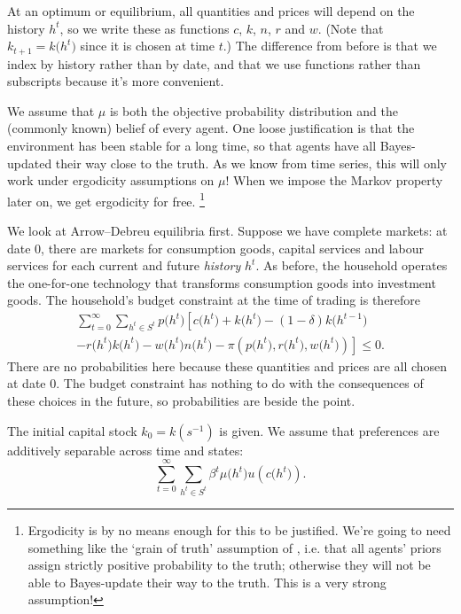 \documentclass[11pt,letterpaper,reqno,oneside]{article}
\begin{document}
At an optimum or equilibrium, all quantities and prices will depend on the history $h^t$, so we write these as functions $c$, $k$, $n$, $r$ and $w$. (Note that $k_{t+1} = k\bigl(h^t\bigr)$ since it is chosen at time $t$.) The difference from before is that we index by history rather than by date, and that we use functions rather than subscripts because it's more convenient.

We assume that $\mu$ is both the objective probability distribution and the (commonly known) belief of every agent. One loose justification is that the environment has been stable for a long time, so that agents have all Bayes-updated their way close to the truth. As we know from time series, this will only work under ergodicity assumptions on $\mu$! When we impose the Markov property later on, we get ergodicity for free.%
	\footnote{Ergodicity is by no means enough for this to be justified. We're going to need something like the `grain of truth' assumption of \textcite{KalaiLehrer1993}, i.e. that all agents' priors assign strictly positive probability to the truth; otherwise they will not be able to Bayes-update their way to the truth. This is a very strong assumption!}

We look at Arrow--Debreu equilibria first. Suppose we have complete markets: at date $0$, there are markets for consumption goods, capital services and labour services for each current and future \emph{history} $h^t$. As before, the household operates the one-for-one technology that transforms consumption goods into investment goods. The household's budget constraint at the time of trading is therefore
%
\begin{multline*}
	\sum_{t=0}^\infty \sum_{h^t \in S^t} 
	p\bigl(h^t\bigr)
	\left[ c\bigl(h^t\bigr) + k\bigl(h^t\bigr) 
	- (1-\delta) k\bigl(h^{t-1}\bigr) 
	\right.\\\left. 
	- r\bigl(h^t\bigr) k\bigl(h^t\bigr) - w\bigl(h^t\bigr) n\bigl(h^t\bigr) 
	- \pi\left( p\bigl(h^t\bigr), r\bigl(h^t\bigr), w\bigl(h^t\bigr) \right) 
	\right] \leq 0 .
\end{multline*}
%
There are no probabilities here because these quantities and prices are all chosen at date 0. The budget constraint has nothing to do with the consequences of these choices in the future, so probabilities are beside the point.

The initial capital stock $k_0 = k\left(s^{-1}\right)$ is given. We assume that preferences are additively separable across time and states:
%
\begin{equation*}
	\sum_{t=0}^\infty \sum_{h^t \in S^t}
	\beta^t \mu\bigl(h^t\bigr) u\left( c\bigl(h^t\bigr) \right) .
\end{equation*}
\end{document}
